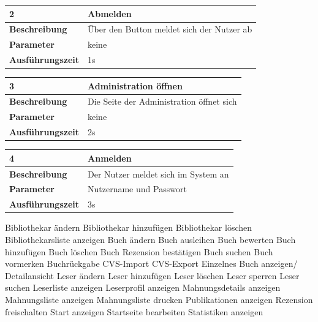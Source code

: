 \documentclass[fontsize=12pt,paper=a4,twoside]{scrartcl}
\begin{document}
  \begin{table}[htbp]
  \label{a2}
  \begin{tabular}{|l|p{10cm}|}
  \hline 
  \textbf{2} & \textbf{Abmelden} \\ \hline
  \textbf{Beschreibung} & Über den Button meldet sich der Nutzer ab\\ \hline
  \textbf{Parameter} & keine \\ \hline
  \textbf{Ausführungszeit} & 1s\\ \hline
  \end{tabular}
  \end{table}
  
  \begin{table}[htbp]
  \label{a3}
  \begin{tabular}{|l|p{10cm}|}
  \hline 
  \textbf{3} & \textbf{Administration öffnen} \\ \hline
  \textbf{Beschreibung} & Die Seite der Administration öffnet sich\\ \hline
  \textbf{Parameter} & keine \\ \hline
  \textbf{Ausführungszeit} & 2s\\ \hline
  \end{tabular}
  \end{table}
  
  \begin{table}[htbp]
  \label{a4}
  \begin{tabular}{|l|p{10cm}|}
  \hline 
  \textbf{4} & \textbf{Anmelden} \\ \hline
  \textbf{Beschreibung} & Der Nutzer meldet sich im System an\\ \hline
  \textbf{Parameter} & Nutzername und Passwort \\ \hline
  \textbf{Ausführungszeit} & 3s\\ \hline
  \end{tabular}
  \end{table}
  
  Bibliothekar ändern
  Bibliothekar hinzufügen
  Bibliothekar löschen
  Bibliothekarsliste anzeigen
  Buch ändern
  Buch ausleihen
  Buch bewerten
  Buch hinzufügen
  Buch löschen
  Buch Rezension bestätigen
  Buch suchen
  Buch vormerken
  Buchrückgabe
  CVS-Import
  CVS-Export
  Einzelnes Buch anzeigen/ Detailansicht
  Leser ändern
  Leser hinzufügen
  Leser löschen
  Leser sperren
  Leser suchen
  Leserliste anzeigen
  Leserprofil anzeigen
  Mahnungsdetails anzeigen
  Mahnungsliste anzeigen
  Mahnungsliste drucken
  Publikationen anzeigen
  Rezension freischalten
  Start anzeigen
  Startseite bearbeiten
  Statistiken anzeigen
  
\end{document}
